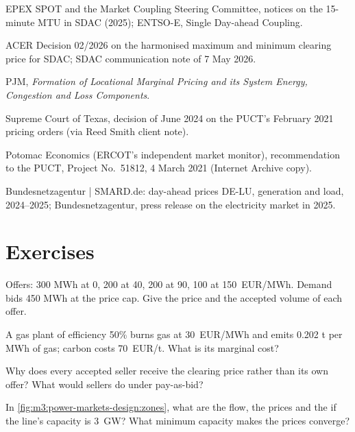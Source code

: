 \begin{omsources}
\item EPEX SPOT and the Market Coupling Steering Committee, notices on the 15-minute MTU
in SDAC (2025); ENTSO-E, Single Day-ahead Coupling.
\item ACER Decision 02/2026 on the harmonised maximum and minimum clearing price for SDAC;
SDAC communication note of 7 May 2026.
\item PJM, \emph{Formation of Locational Marginal Pricing and its System Energy, Congestion
and Loss Components}.
\item Supreme Court of Texas, decision of June 2024 on the PUCT's February 2021 pricing
orders (via Reed Smith client note).
\item Potomac Economics (ERCOT's independent market monitor), recommendation to the PUCT,
Project No.\ 51812, 4 March 2021 (Internet Archive copy).
\item Bundesnetzagentur | SMARD.de: day-ahead prices DE-LU, generation and load, 2024--2025; Bundesnetzagentur, press release
on the electricity market in 2025.
\end{omsources}

\section{Exercises}

\begin{exercise}[$\star$]\label{exo:m3:power-markets-design:1}
Offers: 300 MWh at \qty{0}{}, 200 at \qty{40}{}, 200 at \qty{90}{}, 100 at \qty{150}{EUR/MWh}.
Demand bids 450 MWh at the price cap. Give the price and the accepted volume of each offer.
\end{exercise}

\begin{exercise}[$\star$]\label{exo:m3:power-markets-design:2}
A gas plant of efficiency 50\% burns gas at \qty{30}{EUR/MWh} and emits 0.202 t per MWh of
gas; carbon costs \qty{70}{EUR/t}. What is its marginal cost?
\end{exercise}

\begin{exercise}[$\star$]\label{exo:m3:power-markets-design:3}
Why does every accepted seller receive the clearing price rather than its own offer? What
would sellers do under pay-as-bid?
\end{exercise}

\begin{exercise}[$\star\star$]\label{exo:m3:power-markets-design:4}
In \cref{fig:m3:power-markets-design:zones}, what are the flow, the prices and the
 if the line's capacity is 3~GW? What minimum capacity makes the prices
converge?
\end{exercise}

